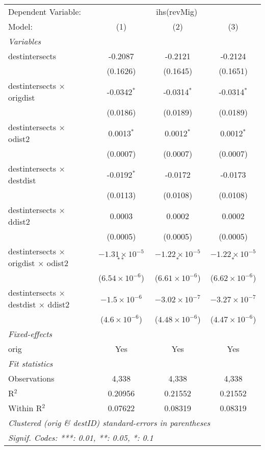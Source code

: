 \begin{tabular}{lccc}
\tabularnewline\midrule\midrule
Dependent Variable:&\multicolumn{3}{c}{ihs(revMig)}\\
Model:&(1) & (2) & (3)\\
\midrule \emph{Variables}&   &   &  \\
destintersects & -0.2087 & -0.2121 & -0.2124\\
  &(0.1626) & (0.1645) & (0.1651)\\
destintersects $\times $ origdist & -0.0342$^{*}$ & -0.0314$^{*}$ & -0.0314$^{*}$\\
  &(0.0186) & (0.0189) & (0.0189)\\
destintersects $\times $ odist2 & 0.0013$^{*}$ & 0.0012$^{*}$ & 0.0012$^{*}$\\
  &(0.0007) & (0.0007) & (0.0007)\\
destintersects $\times $ destdist & -0.0192$^{*}$ & -0.0172 & -0.0173\\
  &(0.0113) & (0.0108) & (0.0108)\\
destintersects $\times $ ddist2 & 0.0003 & 0.0002 & 0.0002\\
  &(0.0005) & (0.0005) & (0.0005)\\
destintersects $\times $ origdist $\times $ odist2 & $-1.31\times 10^{-5}$$^{**}$ & $-1.22\times 10^{-5}$$^{*}$ & $-1.22\times 10^{-5}$$^{*}$\\
  &($6.54\times 10^{-6}$) & ($6.61\times 10^{-6}$) & ($6.62\times 10^{-6}$)\\
destintersects $\times $ destdist $\times $ ddist2 & $-1.5\times 10^{-6}$ & $-3.02\times 10^{-7}$ & $-3.27\times 10^{-7}$\\
  &($4.6\times 10^{-6}$) & ($4.48\times 10^{-6}$) & ($4.47\times 10^{-6}$)\\
\midrule \emph{Fixed-effects}&   &   &  \\
orig & Yes & Yes & Yes\\
\midrule \emph{Fit statistics}&  & & \\
Observations & 4,338&4,338&4,338\\
R$^2$ & 0.20956&0.21552&0.21552\\
Within R$^2$ & 0.07622&0.08319&0.08319\\
\midrule\midrule\multicolumn{4}{l}{\emph{Clustered (orig \& destID) standard-errors in parentheses}}\\
\multicolumn{4}{l}{\emph{Signif. Codes: ***: 0.01, **: 0.05, *: 0.1}}\\
\end{tabular}



